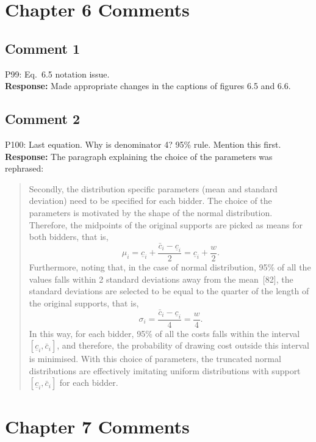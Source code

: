 \documentclass[10pt,a4paper,notitlepage]{article}
\numberwithin{equation}{section}
\begin{document}
\clearpage

\section{Chapter 6 Comments}
\subsection{Comment 1}
P99: Eq.~6.5 notation issue.\\[-2ex]

\textbf{Response:}
Made appropriate changes in the captions of figures 6.5 and 6.6.

\subsection{Comment 2}
P100: Last equation. Why is denominator 4? 95\% rule. Mention this first.\\[-2ex]

\textbf{Response:}
The paragraph explaining the choice of the parameters was rephrased:
\begin{quote}
Secondly, the distribution specific parameters (mean and standard deviation) need to be specified for each bidder. The choice of the parameters is motivated by the shape of the normal distribution. Therefore, the midpoints of the original supports are picked as means for both bidders, that is,
\begin{equation}
\mu_i = \underline{c}_i + \frac{\bar{c}_i - \underline{c}_i}{2} = \underline{c}_i + \frac{w}{2}.
\end{equation}
Furthermore, noting that, in the case of normal distribution, 95\% of all the values falls within 2 standard deviations away from the mean~[82], the standard deviations are selected to be equal to the quarter of the length of the original supports, that is,
\begin{equation}
\sigma_i = \frac{\bar{c}_i - \underline{c}_i}{4} = \frac{w}{4}.
\end{equation}
In this way, for each bidder, 95\% of all the costs falls within the interval $[\underline{c}_i, \bar{c}_i]$, and therefore, the probability of drawing cost outside this interval is minimised. With this choice of parameters, the truncated normal distributions are effectively imitating uniform distributions with support $[\underline{c}_i, \bar{c}_i]$ for each bidder.
\end{quote}

\clearpage

\section{Chapter 7 Comments}
\end{document}
